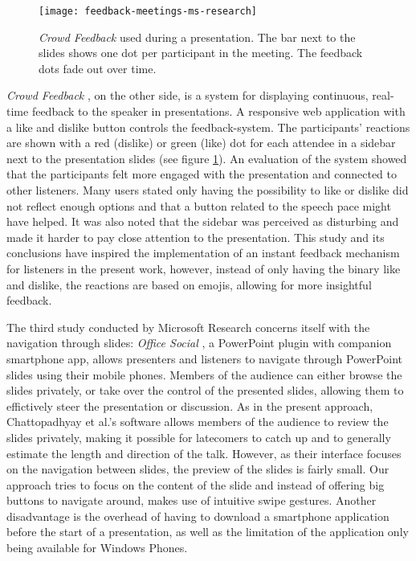 \begin{figure}
\centering
\texttt{[image: feedback-meetings-ms-research]}
\caption{\emph{Crowd Feedback} \cite{Teevan:MobileFeedbackDuringPresentation} used during a presentation. The bar next to the slides shows one dot per participant in the meeting. The feedback dots fade out over time.}
\label{fig:related-work-crowd-feedback}
\end{figure}

\emph{Crowd Feedback} \cite{Teevan:MobileFeedbackDuringPresentation}, on the other side, is a system for displaying continuous, real-time feedback to the speaker in presentations. A responsive web application with a like and dislike button controls the feedback-system. The participants' reactions are shown with a red (dislike) or green (like) dot for each attendee in a sidebar next to the presentation slides (see figure \ref{fig:related-work-crowd-feedback}). An evaluation of the system showed that the participants felt more engaged with the presentation and connected to other listeners. Many users stated only having the possibility to like or dislike did not reflect enough options and that a button related to the speech pace might have helped. It was also noted that the sidebar was perceived as disturbing and made it harder to pay close attention to the presentation. This study and its conclusions have inspired the implementation of an instant feedback mechanism for listeners in the present work, however, instead of only having the binary like and dislike, the reactions are based on emojis, allowing for more insightful feedback.

The third study conducted by Microsoft Research concerns itself with the navigation through slides: \emph{Office Social} \cite{Chattopadhyay:OfficeSocialRemoteControl}, a PowerPoint plugin with companion smartphone app, allows presenters and listeners to navigate through PowerPoint slides using their mobile phones. Members of the audience can either browse the slides privately, or take over the control of the presented slides, allowing them to effictively steer the presentation or discussion. As in the present approach, Chattopadhyay et al.'s software allows members of the audience to review the slides privately, making it possible for latecomers to catch up and to generally estimate the length and direction of the talk. However, as their interface focuses on the navigation between slides, the preview of the slides is fairly small. Our approach tries to focus on the content of the slide and instead of offering big buttons to navigate around, makes use of intuitive swipe gestures. Another disadvantage is the overhead of having to download a smartphone application before the start of a presentation, as well as the limitation of the application only being available for Windows Phones.

